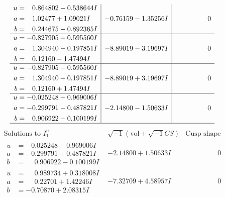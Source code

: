\documentclass[1p]{elsarticle_modified}
\theoremstyle{definition}
\newcommand{\I}{\sqrt{-1}}
\begin{document}
$$\begin{array}{c|c|c}
\begin{aligned}
u &= \phantom{-}0.864802 - 0.538644 I \\
a &= \phantom{-}1.02477 + 1.09021 I \\
b &= \phantom{-}0.244675 - 0.892365 I\end{aligned}
 & -0.76159 - 1.35256 I & \phantom{-0.000000 } 0 \\ \hline\begin{aligned}
u &= -0.827905 + 0.595560 I \\
a &= \phantom{-}1.304940 - 0.197851 I \\
b &= \phantom{-}0.12160 - 1.47494 I\end{aligned}
 & -8.89019 - 3.19697 I & \phantom{-0.000000 } 0 \\ \hline\begin{aligned}
u &= -0.827905 - 0.595560 I \\
a &= \phantom{-}1.304940 + 0.197851 I \\
b &= \phantom{-}0.12160 + 1.47494 I\end{aligned}
 & -8.89019 + 3.19697 I & \phantom{-0.000000 } 0 \\ \hline\begin{aligned}
u &= -0.025248 + 0.969006 I \\
a &= -0.299791 - 0.487821 I \\
b &= \phantom{-}0.906922 + 0.100199 I\end{aligned}
 & -2.14800 - 1.50633 I & \phantom{-0.000000 } 0\\
 \hline 
 \end{array}$$\newpage$$\begin{array}{c|c|c}  
\text{Solutions to }I^u_{1}& \I (\text{vol} + \sqrt{-1}CS) & \text{Cusp shape}\\
 \hline 
\begin{aligned}
u &= -0.025248 - 0.969006 I \\
a &= -0.299791 + 0.487821 I \\
b &= \phantom{-}0.906922 - 0.100199 I\end{aligned}
 & -2.14800 + 1.50633 I & \phantom{-0.000000 } 0 \\ \hline\begin{aligned}
u &= \phantom{-}0.989734 + 0.318008 I \\
a &= \phantom{-}0.22701 + 1.42246 I \\
b &= -0.70870 + 2.08315 I\end{aligned}
 & -7.32709 + 4.58957 I & \phantom{-0.000000 } 0 \\ \hline\begin{aligned}

\end{aligned}
\end{array}$$
\end{document}
